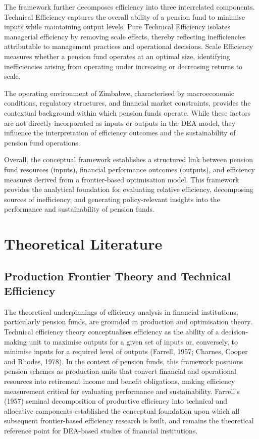\documentclass[12pt,a4paper]{article}
\begin{document}
The framework further decomposes efficiency into three interrelated components. Technical Efficiency captures the overall ability of a pension fund to minimise inputs while maintaining output levels. Pure Technical Efficiency isolates managerial efficiency by removing scale effects, thereby reflecting inefficiencies attributable to management practices and operational decisions. Scale Efficiency measures whether a pension fund operates at an optimal size, identifying inefficiencies arising from operating under increasing or decreasing returns to scale.

The operating environment of Zimbabwe, characterised by macroeconomic conditions, regulatory structures, and financial market constraints, provides the contextual background within which pension funds operate. While these factors are not directly incorporated as inputs or outputs in the DEA model, they influence the interpretation of efficiency outcomes and the sustainability of pension fund operations.

Overall, the conceptual framework establishes a structured link between pension fund resources (inputs), financial performance outcomes (outputs), and efficiency measures derived from a frontier-based optimisation model. This framework provides the analytical foundation for evaluating relative efficiency, decomposing sources of inefficiency, and generating policy-relevant insights into the performance and sustainability of pension funds.

\section{Theoretical Literature}

\subsection{Production Frontier Theory and Technical Efficiency}

The theoretical underpinnings of efficiency analysis in financial institutions, particularly pension funds, are grounded in production and optimisation theory. Technical efficiency theory conceptualises efficiency as the ability of a decision-making unit to maximise outputs for a given set of inputs or, conversely, to minimise inputs for a required level of outputs (Farrell, 1957; Charnes, Cooper and Rhodes, 1978). In the context of pension funds, this framework positions pension schemes as production units that convert financial and operational resources into retirement income and benefit obligations, making efficiency measurement critical for evaluating performance and sustainability. Farrell's (1957) seminal decomposition of productive efficiency into technical and allocative components established the conceptual foundation upon which all subsequent frontier-based efficiency research is built, and remains the theoretical reference point for DEA-based studies of financial institutions.
\end{document}
